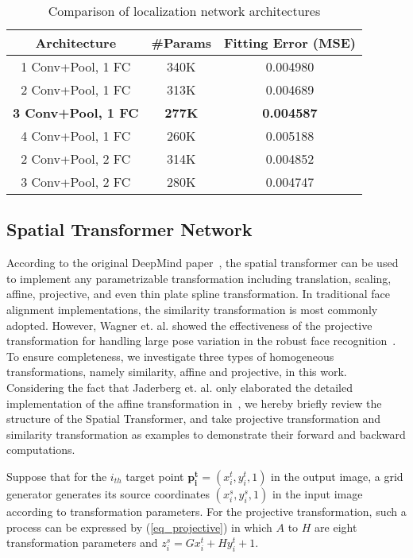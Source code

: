 \documentclass[10pt,twocolumn,letterpaper]{article}
\begin{document}
	\begin{table} %
		\caption{Comparison of localization network architectures}
		\label{tableLoc}
		\centering
		\begin{tabular}{ccc}%
			\hline
			Architecture & \#Params & Fitting Error (MSE)\\
			\hline
			1 Conv+Pool, 1 FC & 340K & 0.004980 \\
			2 Conv+Pool, 1 FC & 313K & 0.004689 \\
			\textbf{3 Conv+Pool, 1 FC} & \textbf{277K} & \textbf{0.004587} \\
			4 Conv+Pool, 1 FC & 260K & 0.005188 \\
			2 Conv+Pool, 2 FC & 314K & 0.004852 \\
			3 Conv+Pool, 2 FC & 280K & 0.004747 \\
			\hline
		\end{tabular}
	\end{table}
	
			
\subsection{Spatial Transformer Network}

According to the original DeepMind paper~\cite{jaderberg2015spatial}, the spatial transformer can be used to implement any parametrizable transformation including translation, scaling, affine, projective, and even thin plate spline transformation.
In traditional face alignment implementations, the similarity transformation is most commonly adopted. 
However, Wagner et. al. showed the effectiveness of the projective transformation for handling large pose variation in the robust face recognition~\cite{Wagner2012Toward}. 
To ensure completeness, we investigate three types of homogeneous transformations, namely similarity, affine and projective, in this work.
Considering the fact that Jaderberg et. al. only elaborated the detailed implementation of the affine transformation in~\cite{jaderberg2015spatial}, we hereby briefly review the structure of the Spatial Transformer, and take projective transformation and similarity transformation as examples to demonstrate their forward and backward computations.

Suppose that for the $i_{th}$ target point $\mathbf{p^t_i} = (x^t_i,y^t_i,1)$ in the output image, a grid generator generates its source coordinates $(x^s_i,y^s_i,1)$ in the input image according to transformation parameters. 
For the projective transformation, such a process can be expressed by (\ref{eq_projective}) in which $A$ to $H$ are eight transformation parameters and $z^s_i = G x^t_i + H y^t_i + 1$.
\end{document}
